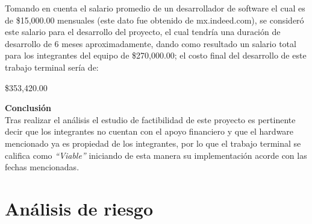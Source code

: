 \documentclass[12pt, a4paper, titlepage]{report}
\begin{document}
    	Tomando en cuenta el salario promedio de un desarrollador de software el cual es de \$15,000.00 mensuales (este dato fue obtenido de mx.indeed.com), se consideró este salario para el desarrollo del proyecto, el cual tendría una duración de desarrollo de 6 meses aproximadamente, dando como resultado un salario total para los integrantes del equipo de \$270,000.00; el costo final del desarrollo de este trabajo terminal sería de: \\
    	\begin{center}
    		\$353,420.00
    	\end{center}
    	\textbf{Conclusión\\} 
    	Tras realizar el análisis el estudio de factibilidad de este proyecto es pertinente decir que los integrantes no cuentan con el apoyo financiero y que el hardware mencionado ya es propiedad de los integrantes, por lo que el trabajo terminal se califica como \textit{“Viable”} iniciando de esta manera su implementación acorde con las fechas mencionadas.
    	
    	\section{Análisis de riesgo}
    	
\end{document}
